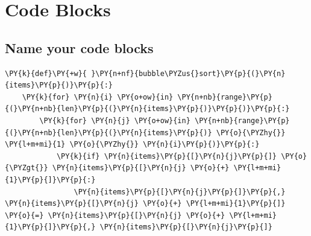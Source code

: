 \section{Code Blocks}
\subsection{Name your code blocks}
\begin{tscode}[lang=py, title={Bubble Sort Algorithm}, engine=pygments]
\begin{Verbatim}[commandchars=\\\{\},breaklines, breakanywhere, commandchars=\\\{\}]
\PY{k}{def}\PY{+w}{ }\PY{n+nf}{bubble\PYZus{}sort}\PY{p}{(}\PY{n}{items}\PY{p}{)}\PY{p}{:}
    \PY{k}{for} \PY{n}{i} \PY{o+ow}{in} \PY{n+nb}{range}\PY{p}{(}\PY{n+nb}{len}\PY{p}{(}\PY{n}{items}\PY{p}{)}\PY{p}{)}\PY{p}{:}
        \PY{k}{for} \PY{n}{j} \PY{o+ow}{in} \PY{n+nb}{range}\PY{p}{(}\PY{n+nb}{len}\PY{p}{(}\PY{n}{items}\PY{p}{)} \PY{o}{\PYZhy{}} \PY{l+m+mi}{1} \PY{o}{\PYZhy{}} \PY{n}{i}\PY{p}{)}\PY{p}{:}
            \PY{k}{if} \PY{n}{items}\PY{p}{[}\PY{n}{j}\PY{p}{]} \PY{o}{\PYZgt{}} \PY{n}{items}\PY{p}{[}\PY{n}{j} \PY{o}{+} \PY{l+m+mi}{1}\PY{p}{]}\PY{p}{:}
                \PY{n}{items}\PY{p}{[}\PY{n}{j}\PY{p}{]}\PY{p}{,} \PY{n}{items}\PY{p}{[}\PY{n}{j} \PY{o}{+} \PY{l+m+mi}{1}\PY{p}{]} \PY{o}{=} \PY{n}{items}\PY{p}{[}\PY{n}{j} \PY{o}{+} \PY{l+m+mi}{1}\PY{p}{]}\PY{p}{,} \PY{n}{items}\PY{p}{[}\PY{n}{j}\PY{p}{]}
\end{Verbatim}
\end{tscode}

